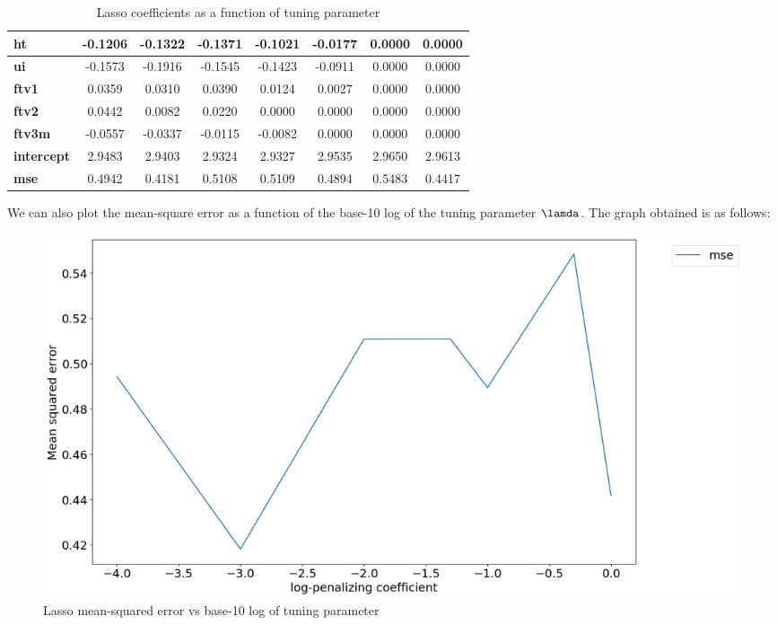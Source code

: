 \documentclass[a4paper,12pt]{article}
\begin{document}
\begin{table}[H]
\begin{tabular}{|l|c|c|c|c|c|c|c|}
\textbf{ht}          & -0.1206         & -0.1322         & -0.1371         & -0.1021         & -0.0177         & 0.0000          & 0.0000          \\ \hline
\textbf{ui}          & -0.1573         & -0.1916         & -0.1545         & -0.1423         & -0.0911         & 0.0000          & 0.0000          \\ \hline
\textbf{ftv1}        & 0.0359          & 0.0310          & 0.0390          & 0.0124          & 0.0027          & 0.0000          & 0.0000          \\ \hline
\textbf{ftv2}        & 0.0442          & 0.0082          & 0.0220          & 0.0000          & 0.0000          & 0.0000          & 0.0000          \\ \hline
\textbf{ftv3m}       & -0.0557         & -0.0337         & -0.0115         & -0.0082         & 0.0000          & 0.0000          & 0.0000          \\ \hline
\textbf{intercept}   & 2.9483          & 2.9403          & 2.9324          & 2.9327          & 2.9535          & 2.9650          & 2.9613          \\ \hline
\textbf{mse}         & 0.4942          & 0.4181          & 0.5108          & 0.5109          & 0.4894          & 0.5483          & 0.4417          \\ \hline
\end{tabular}
\caption{Lasso coefficients as a function of tuning parameter}
\end{table}

\noindent  We can also plot the mean-square error as a function of the base-10 log of the tuning parameter $\lamda$. The graph obtained is as follows:
\begin{figure}[H]
    \centering
    \includegraphics[scale=0.3]{mse-lambda-lasso.png}
    \caption{Lasso mean-squared error vs base-10 log of tuning parameter}
    \label{fig:neurons}
\end{figure}
\end{document}
